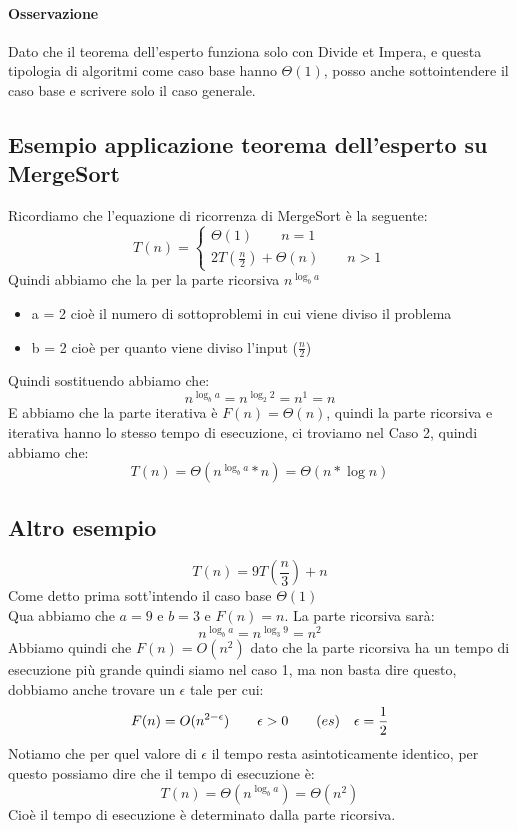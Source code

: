 \paragraph*{Osservazione} Dato che il teorema dell'esperto funziona solo con Divide et Impera, e questa
tipologia di algoritmi come caso base hanno $\Theta(1)$, posso anche sottointendere il caso base e scrivere solo
il caso generale.
\subsection{Esempio applicazione teorema dell'esperto su MergeSort}
Ricordiamo che l'equazione di ricorrenza di MergeSort è la seguente:
\begin{equation*}
    T(n)=
    \begin{cases}
        \Theta(1) \qquad n=1 \\
        2T(\frac{n}{2}) + \Theta(n) \qquad n>1
    \end{cases}
\end{equation*}
Quindi abbiamo che la per la parte ricorsiva $n^{\log_b a}$
\begin{itemize}
    \item a = 2 cioè il numero di sottoproblemi in cui viene diviso il problema
    \item b = 2 cioè per quanto viene diviso l'input ($\frac{n}{2}$)
\end{itemize}
Quindi sostituendo abbiamo che:
\begin{equation*}
    n^{\log_b a} = n^{\log_2 2} = n^1 = n
\end{equation*}
E abbiamo che la parte iterativa è $F(n) = \Theta(n)$, quindi la parte ricorsiva e
iterativa hanno lo stesso tempo di esecuzione, ci troviamo nel Caso 2, quindi abbiamo che:
\begin{equation*}
    T(n) = \Theta(n^{\log_b a}*n) = \Theta(n*\log n)
\end{equation*}
\subsection{Altro esempio}
\begin{equation*}
    T(n) = 9T(\frac{n}{3})+n
\end{equation*}
Come detto prima sott'intendo il caso base $\Theta(1)$\\
Qua abbiamo che $a=9$ e $b=3$ e $F(n)=n$. La parte ricorsiva sarà:
\begin{equation*}
    n^{\log_b a} = n^{\log_3 9} = n^2
\end{equation*}
Abbiamo quindi che $F(n) = O(n^2)$ dato che la parte ricorsiva ha un tempo di
esecuzione più grande quindi siamo nel caso 1, ma non basta dire questo, dobbiamo anche trovare
un $\epsilon$ tale per cui:
\begin{equation*}
    F(n) = O(n^{2-\epsilon}) \qquad \epsilon>0 \qquad \text(es) \quad \epsilon = \frac{1}{2}
\end{equation*}
Notiamo che per quel valore di $\epsilon$ il tempo resta asintoticamente identico, per questo possiamo
dire che il tempo di esecuzione è:
\begin{equation*}
    T(n)=\Theta(n^{\log_b a}) = \Theta(n^2)
\end{equation*}
Cioè il tempo di esecuzione è determinato dalla parte ricorsiva.
